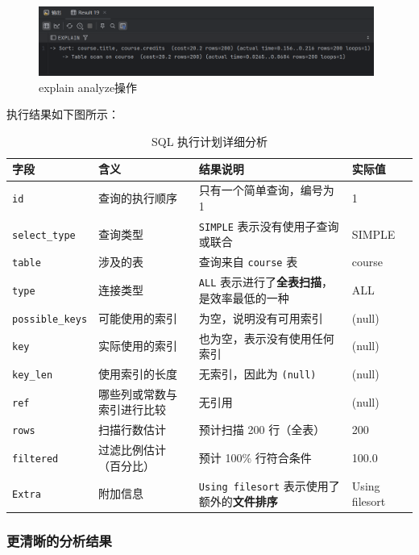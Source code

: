 \documentclass{article}
\begin{document}
	\begin{figure}[H]
		\centering
		\includegraphics[width=11cm]{./images/3.解释操作2.png}
		\caption{explain analyze操作}
	\end{figure}
	
	执行结果如下图所示：
	
	\begin{table}[H]
		\centering
		\begin{tabular}{|l|l|p{6cm}|l|}
			\hline
			\textbf{字段} & \textbf{含义} & \textbf{结果说明} & \textbf{实际值} \\
			\hline
			\texttt{id} & 查询的执行顺序 & 只有一个简单查询，编号为 1 & 1 \\
			\hline
			\texttt{select\_type} & 查询类型 & \texttt{SIMPLE} 表示没有使用子查询或联合 & SIMPLE \\
			\hline
			\texttt{table} & 涉及的表 & 查询来自 \texttt{course} 表 & course \\
			\hline
			\texttt{type} & 连接类型 & \texttt{ALL} 表示进行了\textbf{全表扫描}，是效率最低的一种 & ALL \\
			\hline
			\texttt{possible\_keys} & 可能使用的索引 & 为空，说明没有可用索引 & (null) \\
			\hline
			\texttt{key} & 实际使用的索引 & 也为空，表示没有使用任何索引 & (null) \\
			\hline
			\texttt{key\_len} & 使用索引的长度 & 无索引，因此为 \texttt{(null)} & (null) \\
			\hline
			\texttt{ref} & 哪些列或常数与索引进行比较 & 无引用 & (null) \\
			\hline
			\texttt{rows} & 扫描行数估计 & 预计扫描 200 行（全表） & 200 \\
			\hline
			\texttt{filtered} & 过滤比例估计（百分比） & 预计 100\% 行符合条件 & 100.0 \\
			\hline
			\texttt{Extra} & 附加信息 & \texttt{Using filesort} 表示使用了额外的\textbf{文件排序} & Using filesort \\
			\hline
		\end{tabular}
		\caption{SQL 执行计划详细分析}
	\end{table}
	
	\subsubsection{更清晰的分析结果}
	
\end{document}
